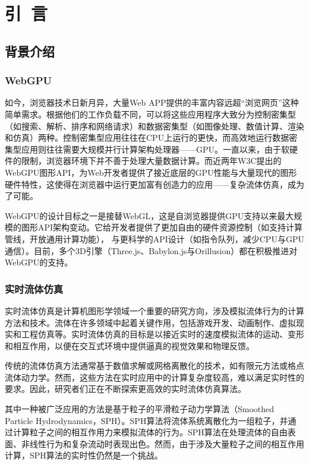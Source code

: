 \section{引~言}
\subsection{背景介绍}
\subsubsection{WebGPU}
    如今，浏览器技术日新月异，大量Web APP提供的丰富内容远超“浏览网页”这种简单需求。根据他们的工作负载不同，可以将这些应用程序大致分为控制密集型（如搜索、解析、排序和网络请求）和数据密集型（如图像处理、数值计算、渲染和仿真）两种\cite{K22WebGPU1}。控制密集型应用往往在CPU上运行的更快，而高效地运行数据密集型应用则往往需要大规模并行计算架构处理器——GPU。一直以来，由于软硬件的限制，浏览器环境下并不善于处理大量数据计算。而近两年W3C提出的WebGPU图形API，为Web开发者提供了接近底层的GPU性能与大量现代的图形硬件特性，这使得在浏览器中运行更加富有创造力的应用——复杂流体仿真，成为了可能。
    
    WebGPU的设计目标之一是接替WebGL，这是自浏览器提供GPU支持以来最大规模的图形API架构变动。它给开发者提供了更加自由的硬件资源控制（如支持计算管线，开放通用计算功能）， 与更科学的API设计（如指令队列，减少CPU与GPU通信）\cite{K22WebGPU2}。目前，多个3D引擎（Three.js、Babylon.js与Orillusion）都在积极推进对WebGPU的支持。

\subsubsection{实时流体仿真}
    实时流体仿真是计算机图形学领域一个重要的研究方向，涉及模拟流体行为的计算方法和技术。流体在许多领域中起着关键作用，包括游戏开发、动画制作、虚拟现实和工程仿真等。实时流体仿真的目标是以接近实时的速度模拟流体的运动、变形和相互作用，以便在交互式环境中提供逼真的视觉效果和物理反馈。
    
    传统的流体仿真方法通常基于数值求解或网格离散化的技术，如有限元方法或格点流体动力学。然而，这些方法在实时应用中的计算复杂度较高，难以满足实时性的要求。因此，研究者们正在不断探索更高效的实时流体仿真算法。
    
    其中一种被广泛应用的方法是基于粒子的平滑粒子动力学算法（Smoothed Particle Hydrodynamics，SPH）。SPH算法将流体系统离散化为一组粒子，并通过计算粒子之间的相互作用力来模拟流体的行为。SPH算法在处理流体的自由表面、非线性行为和复杂流动时表现出色。然而，由于涉及大量粒子之间的相互作用计算，SPH算法的实时性仍然是一个挑战。
    
